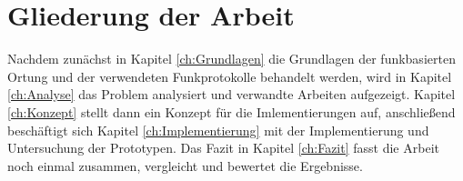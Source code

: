 \section{Gliederung der Arbeit}
\label{ch:Einleitung:sec:Gliederung}
Nachdem zunächst in Kapitel \ref{ch:Grundlagen} die Grundlagen der funkbasierten Ortung und der verwendeten Funkprotokolle behandelt werden, wird in Kapitel \ref{ch:Analyse} das Problem analysiert und verwandte Arbeiten aufgezeigt.
Kapitel \ref{ch:Konzept} stellt dann ein Konzept für die Imlementierungen auf, anschließend beschäftigt sich Kapitel \ref{ch:Implementierung} mit der Implementierung und Untersuchung der Prototypen.
Das Fazit in Kapitel \ref{ch:Fazit} fasst die Arbeit noch einmal zusammen, vergleicht und bewertet die Ergebnisse.
